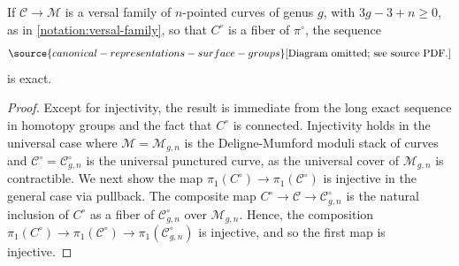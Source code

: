 \begin{lemma}
\notready\label{lemma:SES-pi1-versal-curves}
If $\mathscr{C} \to \mathscr{M}$ is a versal family of $n$-pointed curves of
genus $g$, with $3g - 3 + n \geq 0$, as in \autoref{notation:versal-family},
so that $C^\circ$ is a fiber of $\pi^\circ$,
the sequence
\begin{equation}
	\label{equation:fibration-sequence}
\source{canonical-representations-surface-groups}
	\text{[Diagram omitted; see source PDF.]}\end{equation}
is exact.
\end{lemma}
\begin{proof}
Except for injectivity, the result is immediate from the long exact sequence in
homotopy groups and the fact that ${C}^\circ$ is connected. Injectivity holds in
the universal case where $\mathscr{M}=\mathscr{M}_{g,n}$ is the Deligne-Mumford
moduli stack of curves and $\mathscr{C}^\circ = \mathscr{C}^\circ_{g,n}$ is the
universal punctured curve, as the universal cover of $\mathscr{M}_{g,n}$ is contractible.
We next show the map $\pi_1(C^\circ) \to
\pi_1(\mathscr C^\circ)$ is injective in the general case via pullback.
The composite map $C^\circ \to \mathscr C \to \mathscr{C}^\circ_{g,n}$
is the natural inclusion of $C^\circ$ as a fiber of $\mathscr{C}^\circ_{g,n}$
over $\mathscr M_{g,n}$.
Hence, the composition $\pi_1(C^\circ) \to \pi_1(\mathscr C^\circ) \to \pi_1(\mathscr
C^\circ_{g,n})$ is injective, and so the first map is injective.
\end{proof}


